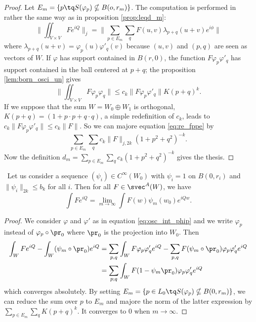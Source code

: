 \begin{proof}
Let $E_m=\{ p\tq S(\varphi_p)\nsubseteq B(o,r_m) \}$. The computation is performed in rather the same way as in proposition \ref{prop:leqd_m}:
\begin{equation}  \label{eq:re_fppe}
\| \iint_{V\times V}Fe^{iQ} \|_j=\| \sum_{p\in E_m}\sum_q F(u,v)\lambda_{p+q}(u+v)e^{i\phi}  \| 
\end{equation}
where $\lambda_{p+q}(u+v)=\varphi_p(u)\varphi'_q(v)$ because $(u,v)$ and $(p,q)$ are seen as vectors of $W$. If $\varphi$ has support contained in $B(r,0)$, the function $F\varphi_p\varphi'_q$ has support contained in the ball centered at $p+q$; the proposition 
\ref{lem:born_osci_un} gives
\[ 
  \| \iint_{V\times V}F\varphi_p\varphi_q \|\leq c_k\| F\varphi_p\varphi'_q \|K(p+q)^k.
\]
If we suppose that the sum $W=W_0\oplus W_1$ is orthogonal, $K(p+q)=(1+p\cdot p+q\cdot q)$, a simple redefinition of $c_k$, leads to $c_k\| F\varphi_p\varphi'_q \|\leq c_k\| F \|$. So we can majore equation \eqref{eq:re_fppe} by 
\[ 
  \sum_{p\in E_m}\sum_qc_k\| F \|_{j,2k}(1+p^2+q^2)^{-k}.
\]
Now the definition $d_m=\sum_{p\in E_m}\sum_qc_k(1+p^2+q^2)^{-k}$ gives the thesis. 
\end{proof}

\begin{proposition}\
Let us consider a sequence $(\psi_i)\in C^{\infty}(W_0)$ with $\psi_i=1$ on $B(0,r_i)$ and $\| \psi_i \|_{2k}\leq b_k$ for all $i$. Then for all $F\in\svec^A(W)$, we have
\begin{equation}
\int Fe^{iQ}=\lim_{m\to\infty}\int F(w)\psi_m(w_0)e^{iQw}.
\end{equation}

\end{proposition}


\begin{proof}
We consider $\varphi$ and $\varphi'$ as in equation \eqref{eq:osc_int_phip} and we write $\varphi_p$ instead of $\varphi_p\circ\pr_0$ where $\pr_0$ is the projection into $W_0$. Then
\begin{equation}
\begin{split}
  \int_WFe^{iQ}-\int_W(\psi_m\circ\pr_0)e^{iQ}&=\sum_{p,q}\int_WF\varphi_p\varphi'_qe^{iQ}
                          -\sum_{p,q}F(\psi_m\circ\pr_0)\varphi_p\varphi'_qe^{iQ}\\
                      &=\sum_{p;q}\int_WF(1-\psi_m\pr_0)\varphi_p\varphi'_qe^{iQ}
\end{split}
\end{equation}
which converges absolutely. By setting $E_m=\{ p\in L_0\tq S(\varphi_p)\nsubseteq B(0,r_m) \}$, we can reduce the sum over $p$ to $E_m$ and majore the norm of the latter expression by $\sum_{p\in E_m}\sum_qK(p+q)^k$. It converges to $0$ when $m\to \infty$.
  
\end{proof}

